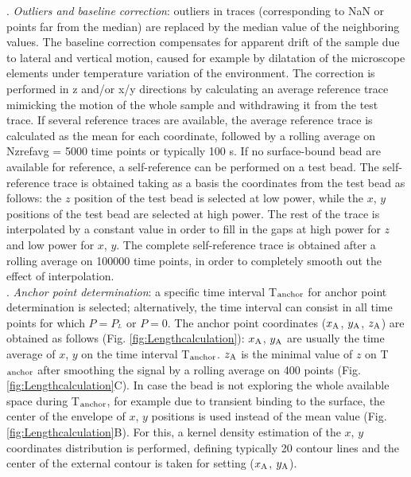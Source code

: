 \documentclass{biophys-new}
\begin{document}
.\textit{ Outliers and baseline correction}: outliers in traces (corresponding to NaN or points far from the median) are replaced by the median value of the neighboring values. The baseline correction compensates for apparent drift of the sample due to lateral and vertical motion, caused for example by dilatation of the microscope elements under temperature variation of the environment. The correction is performed in z and/or x/y directions by calculating an average reference trace mimicking the motion of the whole sample and withdrawing it from the test trace. If several reference traces are available, the average reference trace is calculated as the mean for each coordinate, followed by a rolling average on Nzrefavg = 5000 time points or typically 100 s. If no surface-bound bead are available for reference, a self-reference can be performed on a test bead. The self-reference trace is obtained taking as a basis the coordinates from the test bead as follows: the $z$ position of the test bead is selected at low power, while the $x$, $y$ positions of the test bead are selected at high power. %
The rest of the trace is interpolated by a constant value in order to fill in the gaps at high power for $z$ and low power for $x$, $y$. The complete self-reference trace is obtained after a rolling average on 100000 time points, in order to completely smooth out the effect of interpolation.\\

. \textit{ Anchor point determination}: a specific time interval T$_{\rm anchor}$ for anchor point determination is selected; alternatively, the time interval can consist in all time points for which $P=P_{^L}$ or $P=0$. The anchor point coordinates ($x_{\rm A}$, $y_{\rm A}$, $z_{\rm A}$) are obtained as follows (Fig. \ref{fig:Lengthcalculation}): $x_{\rm A}$, $y_{\rm A}$ are usually the time average of $x$, $y$ on the time interval T$_{\rm anchor}$. $z_{\rm A}$ is the minimal value of $z$ on T$_{\rm anchor}$ after smoothing the signal by a rolling average on 400 points (Fig. \ref{fig:Lengthcalculation}C). In case the bead is not exploring the whole available space during T$_{\rm anchor}$, for example due to transient binding to the surface, the center of the envelope of $x$, $y$ positions is used instead of the mean value (Fig. \ref{fig:Lengthcalculation}B). For this, a kernel density estimation of the $x$, $y$ coordinates distribution is performed, defining typically 20 contour lines and the center of the external contour is taken for setting ($x_{\rm A}$, $y_{\rm A}$).\\
\end{document}

